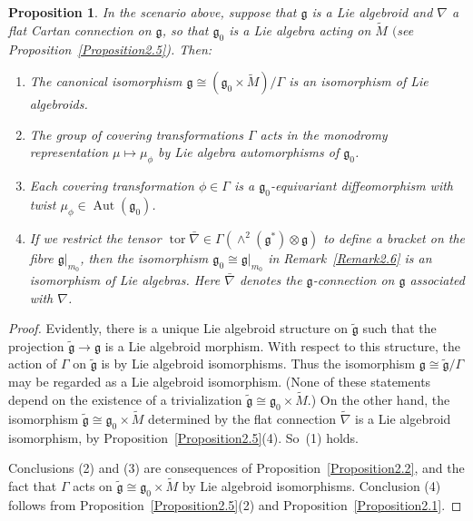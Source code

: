 \documentclass[pdftex]{sigma}
\DeclareMathOperator{\automorphism}{Aut}
\DeclareMathOperator{\torsion}{tor}
\numberwithin{equation}{section}
\newtheorem{PropositionBlaom}[TheoremBlaom]{Proposition}
 { \theoremstyle{definition}
\newtheorem{CounterexampleBlaom}[TheoremBlaom]{Counterexample}
\newtheorem{RemarkBlaom}[TheoremBlaom]{Remark} }
\begin{document}
\begin{PropositionBlaom}\label{Proposition2.6}
  In the scenario above, suppose that $\mathfrak g$ is a Lie algebroid
  and $\nabla$ a flat Cartan connection on $\mathfrak g$, so that
  ${\mathfrak g}_0$ is a Lie algebra acting on $\tilde M$ $($see
  Proposition~{\rm \ref{Proposition2.5})}. Then:
\begin{enumerate}\itemsep=0pt
\item[$(1)$]%
The canonical isomorphism ${\mathfrak g} \cong ({\mathfrak g}_0
  \times \tilde M)/\Gamma$ is an isomorphism of Lie algebroids.
\item[$(2)$]%
The group of covering transformations $\Gamma$ acts in the
  monodromy representation $\mu \mapsto \mu_\phi$ by Lie algebra
  automorphisms of ${\mathfrak g}_0$.
\item[$(3)$]%
Each covering transformation $\phi \in \Gamma $ is a
  ${\mathfrak g}_0 $-equivariant diffeomorphism with twist
  $\mu_\phi\in \automorphism({\mathfrak g}_0)$.
\item[$(4)$]%
If we restrict the tensor $\torsion \bar\nabla \in
  \Gamma(\wedge^2({\mathfrak g}^*)\otimes {\mathfrak g})$ to define a
  bracket on the fibre ${\mathfrak g}|_{m_0}$, then the isomorphism
  ${\mathfrak g}_0\cong {\mathfrak g}|_{m_0}$ in Remark~{\rm \ref{Remark2.6}} is
  an isomorphism of Lie algebras. Here $\bar\nabla $ denotes the
  $\mathfrak g$-connection on $\mathfrak g$ associated with $\nabla$.
\end{enumerate}
\end{PropositionBlaom}

\begin{proof}
  Evidently, there is a unique Lie algebroid structure on $\tilde
  {\mathfrak g}$ such that the projection $\tilde {\mathfrak g}
  \rightarrow {\mathfrak g} $ is a Lie algebroid morphism. With
  respect to this structure, the action of $\Gamma$ on $\tilde
  {\mathfrak g} $ is by Lie algebroid isomorphisms. Thus the
  isomorphism ${\mathfrak g} \cong \tilde {\mathfrak g} / \Gamma $ may
  be regarded as a Lie algebroid isomorphism. (None of these
  statements depend on the existence of a trivialization $\tilde
  {\mathfrak g} \cong {\mathfrak g}_0 \times \tilde M$.) On the other
  hand, the isomorphism $\tilde {\mathfrak g} \cong {\mathfrak g}_0
  \times \tilde M$ determined by the f\/lat connection $\tilde \nabla $
  is a Lie algebroid isomorphism, by Proposition~\ref{Proposition2.5}(4).
   So~(1) holds.

  Conclusions (2) and (3) are consequences of
  Proposition~\ref{Proposition2.2}, %
  and the fact that $\Gamma $ acts on
  $\tilde {\mathfrak g} \cong {\mathfrak g}_0 \times \tilde M$ by Lie
  algebroid isomorphisms. Conclusion (4) follows from
  Proposition~\ref{Proposition2.5}(2) %
  and Proposition~\ref{Proposition2.1}. %
\end{proof}
\end{document}
